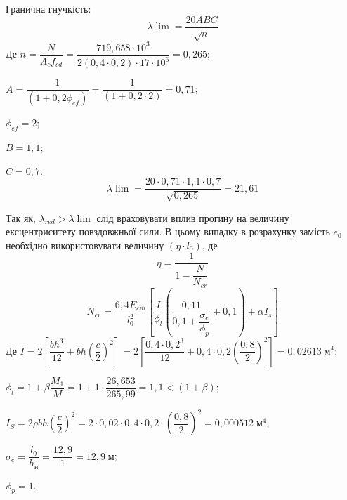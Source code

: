 \documentclass[a4paper,14pt]{article}
\begin{document}
\begin{enumerate}
        Гранична гнучкість:
        \begin{equation}\label{eq:20}
            \lambda \lim = \dfrac{20ABC}{\sqrt{n}}
        \end{equation}
        Де $n = \dfrac{N}{A_cf_{cd}} = \dfrac{719,658 \cdot 10^3}{2(0,4 \cdot 0,2) \cdot 17 \cdot 10^6} = 0,265$;

            $A = \dfrac{1}{(1+0,2\phi_{ef})} = \dfrac{1}{(1+0,2 \cdot 2)} = 0,71$;

            $\phi_{ef} = 2$;

            $B = 1,1$;

            $C = 0,7$.
            $$\lambda\lim = \dfrac{20 \cdot 0,71 \cdot 1,1 \cdot 0,7}{\sqrt{0,265}} = 21,61$$

        Так як, $\lambda_{red} > \lambda\lim$ слід враховувати вплив прогину на величину ексцентриситету повздовжньої сили. В цьому випадку в розрахунку замість $e_0$ необхідно використовувати
        величину $(\eta \cdot l_0)$, де 
        \begin{equation}\label{eq:21}
            \eta = \dfrac{1}{1 - \dfrac{N}{N_{cr}}}
        \end{equation}
        \begin{equation}\label{eq:22}
            N_{cr} = \dfrac{6,4E_{cm}}{l_0^2}\left[\dfrac{I}{\phi_l}\left(\dfrac{0,11}{0,1 + \dfrac{\sigma_e}{\phi_p}} + 0,1\right) + \alpha I_s\right]
        \end{equation}
        Де $I = 2\left[\dfrac{bh^3}{12} + bh \left(\dfrac{c}{2}\right)^2\right] = 2\left[\dfrac{0,4 \cdot 0,2^3}{12} + 0,4 \cdot 0,2 \left(\dfrac{0,8}{2}\right)^2\right] = 0,02613\;\textit{м}^4$;

        $\phi_l = 1 + \beta \dfrac{M_1}{M} = 1 + 1 \cdot \dfrac{26,653}{265,99} = 1,1 < (1 + \beta)$;

        $I_S = 2 \rho bh \left(\dfrac{c}{2}\right)^2 = 2 \cdot 0,02 \cdot 0,4 \cdot 0,2 \cdot \left(\dfrac{0,8}{2}\right)^2 = 0,000512\;\textit{м}^4$;

        $\sigma_e = \dfrac{l_0}{h_\textit{н}} = \dfrac{12,9}{1} = 12,9\;\textit{м}$;

        $\phi_p = 1$.


\end{enumerate}
\end{document}
